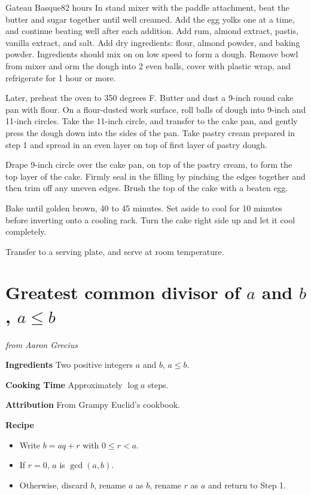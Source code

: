 \documentclass[openany]{book}
\providecommand{\tightlist}{%
  \setlength{\itemsep}{0pt}\setlength{\parskip}{0pt}}
\begin{document}
\begin{recipe}{Gateau Basque}{8}{2 hours}
In stand mixer with the paddle attachment, beat the butter and sugar together until well creamed. Add the egg yolks one at a time, and continue beating well after each addition. Add rum, almond extract, pastis, vanilla extract, and salt. Add dry ingredients: flour, almond powder, and baking powder. Ingredients should mix on on low speed to form a dough. Remove bowl from mixer and orm the dough into 2 even balls, cover with plastic wrap, and refrigerate for 1 hour or more.\par
Later, preheat the oven to 350 degrees F. Butter and dust a 9-inch round cake pan with flour. On a flour-dusted work surface, roll balls of dough into 9-inch and 11-inch circles. Take the 11-inch circle, and transfer to the cake pan, and gently press the dough down into the sides of the pan. Take pastry cream prepared in step 1 and spread in an even layer on top of first layer of pastry dough.\par
Drape 9-inch circle over the cake pan, on top of the pastry cream, to form the top layer of the cake. Firmly seal in the filling by pinching the edges together and then trim off any uneven edges. Brush the top of the cake with a beaten egg.\par
Bake until golden brown, 40 to 45 minutes. Set aside to cool for 10 minutes before inverting onto a cooling rack. Turn the cake right side up and let it cool completely.

\freeform Transfer to a serving plate, and serve at room temperature.
\end{recipe}

\chapter{\texorpdfstring{Greatest common divisor of \(a\) and \(b\),
\(a\leq b\)}{Greatest common divisor of a and b, a\textbackslash{}leq b}}\label{greatest-common-divisor-of-a-and-b-aleq-b}

\emph{from Aaron Grecius}

\textbf{Ingredients} Two positive integers \(a\) and \(b\), \(a\leq b\).

\textbf{Cooking Time} Approximately \(\log a\) steps.

\textbf{Attribution} From Grampy Euclid's cookbook.

\textbf{Recipe}

\begin{itemize}
\tightlist
\item
  Write \(b=aq+r\) with \(0\leq r<a\).
\item
  If \(r=0\), \(a\) is \(\gcd(a,b)\).
\item
  Otherwise, discard \(b\), rename \(a\) as \(b\), rename \(r\) as \(a\)
  and return to Step 1.
\end{itemize}
\end{document}
